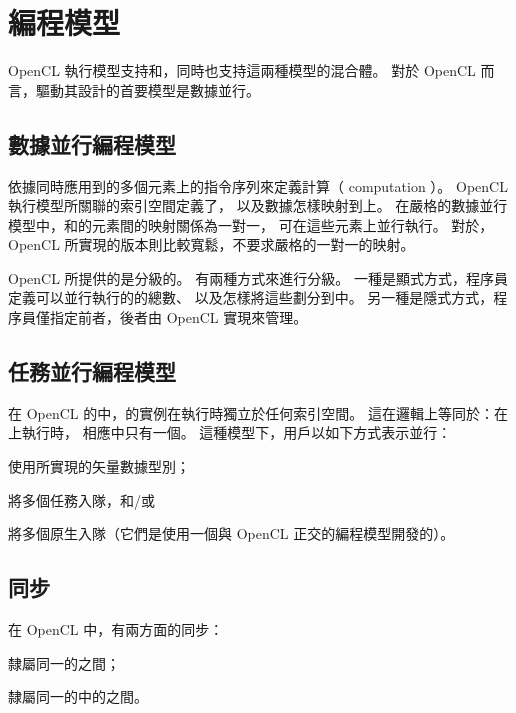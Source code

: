 \section{編程模型}
OpenCL 執行模型支持和，同時也支持這兩種模型的混合體。
對於 OpenCL 而言，驅動其設計的首要模型是數據並行。

\subsection{數據並行編程模型}

依據同時應用到的多個元素上的指令序列來定義計算（ computation ）。
OpenCL 執行模型所關聯的索引空間定義了，
以及數據怎樣映射到上。
在嚴格的數據並行模型中，和的元素間的映射關係為一對一，
可在這些元素上並行執行。
對於，OpenCL 所實現的版本則比較寬鬆，不要求嚴格的一對一的映射。

OpenCL 所提供的是分級的。
有兩種方式來進行分級。
一種是顯式方式，程序員定義可以並行執行的的總數、
以及怎樣將這些劃分到中。
另一種是隱式方式，程序員僅指定前者，後者由 OpenCL 實現來管理。

\subsection{任務並行編程模型}
在 OpenCL 的中，的實例在執行時獨立於任何索引空間。
這在邏輯上等同於：在上執行時，
相應中只有一個。
這種模型下，用戶以如下方式表示並行：
\startigBase
\item 使用所實現的矢量數據型別；
\item 將多個任務入隊，和/或
\item 將多個原生入隊（它們是使用一個與 OpenCL 正交的編程模型開發的）。
\stopigBase

\subsection{同步}
在 OpenCL 中，有兩方面的同步：
\startigBase
\item 隸屬同一的之間；
\item 隸屬同一的中的之間。
\stopigBase

